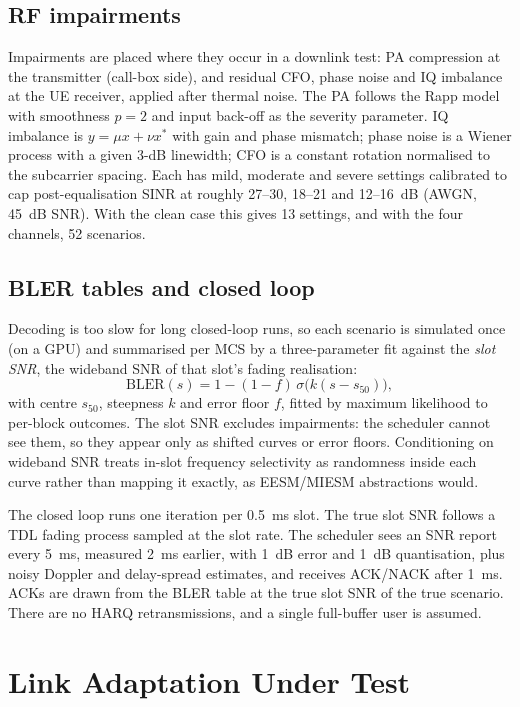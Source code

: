 \documentclass[conference]{IEEEtran}
\begin{document}
\subsection{RF impairments}
Impairments are placed where they occur in a downlink test: PA compression at the transmitter
(call-box side), and residual CFO, phase noise and IQ imbalance at the UE receiver, applied
after thermal noise. The PA follows the Rapp model~\cite{rapp1991} with smoothness $p=2$ and
input back-off as the severity parameter. IQ imbalance is $y=\mu x+\nu x^*$ with gain and phase
mismatch; phase noise is a Wiener process with a given 3-dB linewidth; CFO is a constant
rotation normalised to the subcarrier spacing. Each has mild, moderate and severe settings
calibrated to cap post-equalisation SINR at roughly 27--30, 18--21 and 12--16~dB (AWGN, 45~dB
SNR). With the clean case this gives 13 settings, and with the four channels, 52 scenarios.

\subsection{BLER tables and closed loop}
Decoding is too slow for long closed-loop runs, so each scenario is simulated once (on a GPU)
and summarised per MCS by a three-parameter fit against the \emph{slot SNR}, the wideband SNR
of that slot's fading realisation:
\begin{equation}
\mathrm{BLER}(s)=1-(1-f)\,\sigma\!\big(k(s-s_{50})\big),
\end{equation}
with centre $s_{50}$, steepness $k$ and error floor $f$, fitted by maximum likelihood to
per-block outcomes. The slot SNR excludes impairments: the scheduler cannot see them, so they
appear only as shifted curves or error floors. Conditioning on wideband SNR treats in-slot
frequency selectivity as randomness inside each curve rather than mapping it exactly, as
EESM/MIESM abstractions would.

The closed loop runs one iteration per 0.5~ms slot. The true slot SNR follows a TDL fading
process sampled at the slot rate. The scheduler sees an SNR report every 5~ms, measured 2~ms
earlier, with 1~dB error and 1~dB quantisation, plus noisy Doppler and delay-spread
estimates, and receives ACK/NACK after 1~ms. ACKs are drawn from the BLER table at the true
slot SNR of the true scenario. There are no HARQ retransmissions, and a single full-buffer user
is assumed.

\section{Link Adaptation Under Test}
\end{document}
